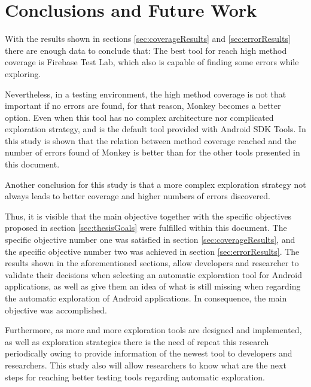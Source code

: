 
\chapter{Conclusions and Future Work} %
\label{Chapter5}

With the results shown in sections \ref{sec:coverageResults} and \ref{sec:errorResults} there are enough data to conclude that: The best tool for reach high method coverage is Firebase Test Lab, which also is capable of finding some errors while exploring.

Nevertheless, in a testing environment, the high method coverage is not that important if no errors are found, for that reason, Monkey becomes a better option. Even when this tool has no complex architecture nor complicated exploration strategy, and is the default tool provided with Android SDK Tools. In this study is shown that the relation between method coverage reached and the number of errors found of Monkey is better than for the other tools presented in this document. 

Another conclusion for this study is that a more complex exploration strategy not always leads to better coverage and higher numbers of errors discovered.

Thus, it is visible that the main objective together with the specific objectives proposed in section \ref{sec:thesisGoals} were fulfilled within this document.
 The specific objective number one was satisfied in section \ref{sec:coverageResults}, and the specific objective number two was achieved in section \ref{sec:errorResults}. The results shown in the aforementioned sections, allow developers and researcher to validate their decisions when selecting an automatic exploration tool for Android applications, as well as give them an idea of what is still missing when regarding the automatic exploration of Android applications. In consequence, the main objective was accomplished.

Furthermore, as more and more exploration tools are designed and implemented, as well as exploration strategies there is the need of repeat this research periodically owing to provide information of the newest tool to developers and researchers. This study also will allow researchers to know what are the next steps for reaching better testing tools regarding automatic exploration. 

